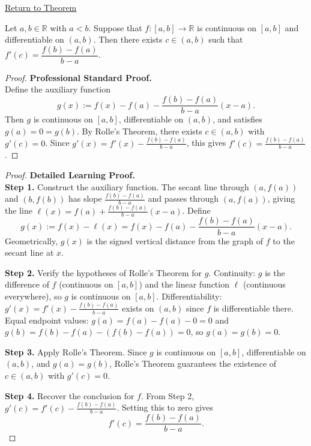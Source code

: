 \newpage
{}
\label{prf:mean-value-theorem}

\begin{remark*}[Return]
\hyperref[thm:mean-value-theorem]{Return to Theorem}
\end{remark*}

\begin{theorem*}
Let $a, b \in \mathbb{R}$ with $a < b$. Suppose that $f : [a,b] \to \mathbb{R}$ is continuous on $[a,b]$ and differentiable on $(a,b)$. Then there exists $c \in (a,b)$ such that $f'(c) = \dfrac{f(b)-f(a)}{b-a}$.
\end{theorem*}

\begin{proof}
\textbf{Professional Standard Proof.}~\\
Define the auxiliary function
\[
g(x) := f(x) - f(a) - \frac{f(b)-f(a)}{b-a}(x-a).
\]
Then $g$ is continuous on $[a,b]$, differentiable on $(a,b)$, and satisfies $g(a) = 0 = g(b)$. By Rolle's Theorem, there exists $c \in (a,b)$ with $g'(c) = 0$. Since $g'(x) = f'(x) - \tfrac{f(b)-f(a)}{b-a}$, this gives $f'(c) = \tfrac{f(b)-f(a)}{b-a}$.
\end{proof}

\begin{proof}
\textbf{Detailed Learning Proof.}~\\

\textbf{Step 1.} Construct the auxiliary function. The secant line through $(a, f(a))$ and $(b, f(b))$ has slope $\tfrac{f(b)-f(a)}{b-a}$ and passes through $(a, f(a))$, giving the line $\ell(x) = f(a) + \tfrac{f(b)-f(a)}{b-a}(x-a)$. Define
\[
g(x) := f(x) - \ell(x) = f(x) - f(a) - \frac{f(b)-f(a)}{b-a}(x-a).
\]
Geometrically, $g(x)$ is the signed vertical distance from the graph of $f$ to the secant line at $x$.

\textbf{Step 2.} Verify the hypotheses of Rolle's Theorem for $g$. Continuity: $g$ is the difference of $f$ (continuous on $[a,b]$) and the linear function $\ell$ (continuous everywhere), so $g$ is continuous on $[a,b]$. Differentiability: $g'(x) = f'(x) - \tfrac{f(b)-f(a)}{b-a}$ exists on $(a,b)$ since $f$ is differentiable there. Equal endpoint values: $g(a) = f(a) - f(a) - 0 = 0$ and $g(b) = f(b) - f(a) - (f(b)-f(a)) = 0$, so $g(a) = g(b) = 0$.

\textbf{Step 3.} Apply Rolle's Theorem. Since $g$ is continuous on $[a,b]$, differentiable on $(a,b)$, and $g(a) = g(b)$, Rolle's Theorem guarantees the existence of $c \in (a,b)$ with $g'(c) = 0$.

\textbf{Step 4.} Recover the conclusion for $f$. From Step 2, $g'(c) = f'(c) - \tfrac{f(b)-f(a)}{b-a}$. Setting this to zero gives
\[
f'(c) = \frac{f(b)-f(a)}{b-a}.
\]
\end{proof}

